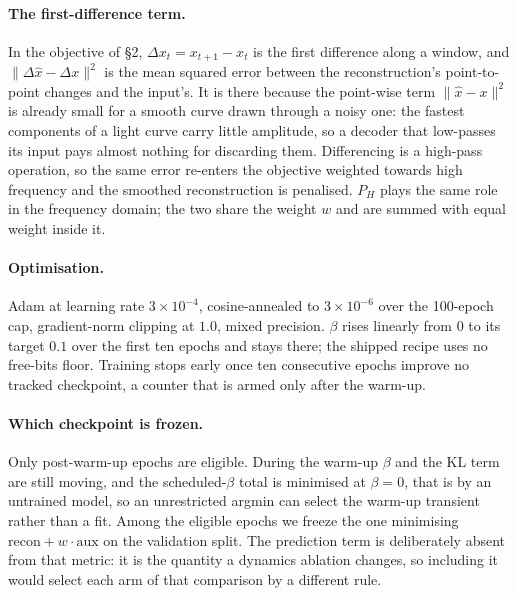 \documentclass{article}
\begin{document}
\paragraph{The first-difference term.} In the objective of \S2, $\Delta x_{t} = x_{t+1} - x_{t}$ is
the first difference along a window, and $\|\Delta\hat{x}-\Delta x\|^{2}$ is the mean squared error
between the reconstruction's point-to-point changes and the input's. It is there because the
point-wise term $\|\hat{x}-x\|^{2}$ is already small for a smooth curve drawn through a noisy one:
the fastest components of a light curve carry little amplitude, so a decoder that low-passes its
input pays almost nothing for discarding them. Differencing is a high-pass operation, so the same
error re-enters the objective weighted towards high frequency and the smoothed reconstruction is
penalised. $P_{H}$ plays the same role in the frequency domain; the two share the weight $w$ and are
summed with equal weight inside it.

\paragraph{Optimisation.} Adam at learning rate $3\times10^{-4}$, cosine-annealed to
$3\times10^{-6}$ over the 100-epoch cap, gradient-norm clipping at $1.0$, mixed precision. $\beta$
rises linearly from $0$ to its target $0.1$ over the first ten epochs and stays there; the shipped
recipe uses no free-bits floor. Training stops early once ten consecutive epochs improve no tracked
checkpoint, a counter that is armed only after the warm-up.

\paragraph{Which checkpoint is frozen.} Only post-warm-up epochs are eligible. During the warm-up
$\beta$ and the KL term are still moving, and the scheduled-$\beta$ total is minimised at $\beta=0$,
that is by an untrained model, so an unrestricted argmin can select the warm-up transient rather than
a fit. Among the eligible epochs we freeze the one minimising
$\mathrm{recon} + w\cdot\mathrm{aux}$ on the validation split. The prediction term is deliberately
absent from that metric: it is the quantity a dynamics ablation changes, so including it would select
each arm of that comparison by a different rule.
\end{document}
